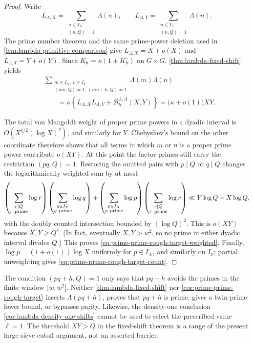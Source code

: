 \begin{proof}
Write
\[
 L_{\Lambda,X}
 =\sum_{\substack{n\in I_X\\(n,Q)=1}}\Lambda(n),
 \qquad
 L_{\Lambda,Y}
 =\sum_{\substack{n\in I_Y\\(n,Q)=1}}\Lambda(n).
\]
The prime number theorem and the same prime-power deletion used in
\cref{lem:lambda-primitive-comparison} give
$L_{\Lambda,X}=X+o(X)$ and $L_{\Lambda,Y}=Y+o(Y)$.  Since
$K_h=\kappa(1+K_h^\circ)$ on $G\times G$,
\cref{thm:lambda-fixed-shift} yields
\begin{align*}
 &\sum_{\substack{m\in I_X,\ n\in I_Y\\
                  (mn,Q)=1,\ (mn+h,Q)=1}}
 \Lambda(m)\Lambda(n)\\
 &\qquad=\kappa\left\{
 L_{\Lambda,X}L_{\Lambda,Y}
 +\mathcal B_h^{\Lambda,\Lambda}(X,Y)
 \right\}
 =\bigl(\kappa+o(1)\bigr)XY.
\end{align*}

The total von Mangoldt weight of proper prime powers in a dyadic interval is
$O(X^{1/2}(\log X)^2)$, and similarly for $Y$.  Chebyshev's bound on the
other coordinate therefore shows that all terms in which $m$ or $n$ is a
proper prime power contribute $o(XY)$.  At this point the factor primes still
carry the restriction $(pq,Q)=1$.  Restoring the omitted pairs with
$p\mid Q$ or $q\mid Q$ changes the logarithmically weighted sum by at most
\[
 \left(\sum_{\substack{r\mid Q\\r\ {\rm prime}}}\log r\right)
 \left(\sum_{\substack{q\in I_Y\\q\ {\rm prime}}}\log q\right)
 +
 \left(\sum_{\substack{p\in I_X\\p\ {\rm prime}}}\log p\right)
 \left(\sum_{\substack{r\mid Q\\r\ {\rm prime}}}\log r\right)
 \ll Y\log Q+X\log Q,
\]
with the doubly counted intersection bounded by $(\log Q)^2$.  This is
$o(XY)$ because $X,Y\ge Q^\delta$.  (In fact, eventually
$X,Y>w^2$, so no prime in either dyadic interval divides $Q$.)  This proves
\eqref{eq:prime-prime-rough-target-weighted}.  Finally,
$\log p=(1+o(1))\log X$ uniformly for $p\in I_X$, and similarly on $I_Y$;
partial unweighting gives \eqref{eq:prime-prime-rough-target-count}.
\end{proof}

\begin{remark}
\label{rem:lambda-rough-not-prime}
The condition $(pq+h,Q)=1$ only says that $pq+h$ avoids the primes in the
finite window $(w,w^2]$.  Neither \cref{thm:lambda-fixed-shift} nor
\cref{cor:prime-prime-rough-target} inserts $\Lambda(pq+h)$, proves that
$pq+h$ is prime, gives a twin-prime lower bound, or bypasses parity.  Likewise,
the density-one conclusion \cref{cor:lambda-density-one-shifts} cannot be used
to select the prescribed value $\ell=1$.  The threshold $XY>Q$ in the
fixed-shift theorem is a range of the present large-sieve cutoff argument,
not an asserted barrier.
\end{remark}
